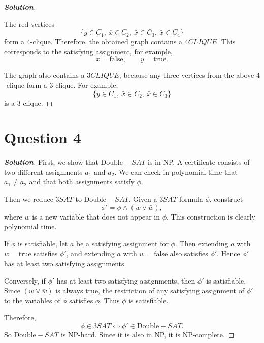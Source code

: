 \documentclass[a4paper, UTF-8]{article}
\theoremstyle{plain}
\newenvironment{solution}{\begin{proof}[\indent\bf Solution]}{\end{proof}}
\begin{document}
\begin{solution}
\begin{center}
\end{center}

The red vertices
\[
  \{y\in C_1,\ \bar x\in C_2,\ \bar x\in C_3,\ \bar x\in C_4\}
\]
form a $4$-clique. Therefore, the obtained graph contains a $4CLIQUE$.
This corresponds to the satisfying assignment, for example,
\[
  x=\text{false},\qquad y=\text{true}.
\]

The graph also contains a $3CLIQUE$, because any three vertices from the above
$4$-clique form a $3$-clique. For example,
\[
  \{y\in C_1,\ \bar x\in C_2,\ \bar x\in C_3\}
\]
is a $3$-clique.
\end{solution}

\section{Question 4}

\begin{solution}
First, we show that $\text{Double}-SAT$ is in NP. A certificate consists of two
different assignments $a_1$ and $a_2$. We can check in polynomial time that
$a_1\neq a_2$ and that both assignments satisfy $\phi$.

Then we reduce $3SAT$ to $\text{Double}-SAT$. Given a $3SAT$ formula $\phi$,
construct
\[
  \phi'=\phi\wedge (w\vee \bar w),
\]
where $w$ is a new variable that does not appear in $\phi$. This construction
is clearly polynomial time.

If $\phi$ is satisfiable, let $a$ be a satisfying assignment for $\phi$. Then
extending $a$ with $w=\text{true}$ satisfies $\phi'$, and extending $a$ with
$w=\text{false}$ also satisfies $\phi'$. Hence $\phi'$ has at least two
satisfying assignments.

Conversely, if $\phi'$ has at least two satisfying assignments, then $\phi'$ is
satisfiable. Since $(w\vee \bar w)$ is always true, the restriction of any
satisfying assignment of $\phi'$ to the variables of $\phi$ satisfies $\phi$.
Thus $\phi$ is satisfiable.

Therefore,
\[
  \phi\in 3SAT\iff \phi'\in \text{Double}-SAT.
\]
So $\text{Double}-SAT$ is NP-hard. Since it is also in NP, it is NP-complete.

\end{solution}
\end{document}
